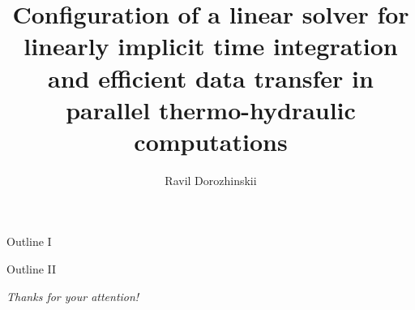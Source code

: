 \documentclass{beamer}
\title{Configuration of a linear solver for linearly
	implicit time integration and efficient data
	transfer in parallel thermo-hydraulic
	computations
}
\author{Ravil Dorozhinskii}
\institute[]{Computational Science and Engineering}
\begin{document}
\begin{frame}
    \titlepage
\end{frame}


%

\begin{frame}{Outline I}
    \small 
    \tableofcontents[sections={1-4}]
\end{frame}









%


\begin{frame}{Outline II}
    \small
    \tableofcontents[sections={5-7}]
\end{frame}

%




%


\begin{frame}{}
    \centering
    \Large
  \emph{Thanks for your attention!}
\end{frame}


\begin{frame}[allowframebreaks]
        \printbibliography{}
\end{frame}
\end{document}
